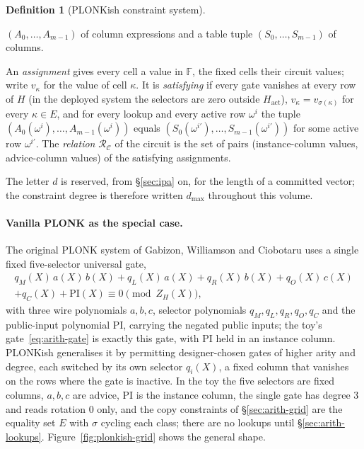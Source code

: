 \documentclass[11pt,a4paper]{article}
\theoremstyle{definition}
\newtheorem{definition}[theorem]{Definition}
\newcommand{\F}{\mathbb{F}}
\newcommand{\Rel}{\mathcal{R}}
\newcommand{\ZH}{Z_H}
\begin{document}
\begin{definition}[PLONKish constraint system]
\begin{enumerate}[leftmargin=*, itemsep=1pt]
  $(A_0, \dots, A_{m-1})$ of column expressions and a table tuple
  $(S_0, \dots, S_{m-1})$ of columns.
\end{enumerate}
An \emph{assignment} gives every cell a value in $\F$, the fixed cells
their circuit values; write $v_\kappa$ for the value of cell $\kappa$. It
is \emph{satisfying} if every gate vanishes at every row of $H$ (in the
deployed system the selectors are zero outside $H_{\mathrm{act}}$),
$v_\kappa = v_{\sigma(\kappa)}$ for every $\kappa \in E$, and for every
lookup and every active row $\omega^i$ the tuple
$(A_0(\omega^i), \dots, A_{m-1}(\omega^i))$ equals
$(S_0(\omega^{i'}), \dots, S_{m-1}(\omega^{i'}))$ for some active row
$\omega^{i'}$. The \emph{relation} $\Rel_{\mathcal C}$ of the circuit is
the set of pairs (instance-column values, advice-column values) of the
satisfying assignments.
\end{definition}

The letter $d$ is reserved, from \S\ref{sec:ipa} on, for the length of a
committed vector; the constraint degree is therefore written $d_{\max}$
throughout this volume.

\paragraph{Vanilla PLONK as the special case.}
The original PLONK system of Gabizon, Williamson and Ciobotaru uses a
single fixed five-selector universal gate,
\begin{multline*}
q_M(X)\,a(X)\,b(X) + q_L(X)\,a(X) + q_R(X)\,b(X) + q_O(X)\,c(X)\\
+ q_C(X) + \mathrm{PI}(X) \equiv 0 \pmod{\ZH(X)},
\end{multline*}
with three wire polynomials $a, b, c$, selector polynomials
$q_M,\allowbreak q_L,\allowbreak q_R,\allowbreak q_O,\allowbreak q_C$ and the
public-input polynomial $\mathrm{PI}$,
carrying the negated public inputs; the toy's gate~\eqref{eq:arith-gate}
is exactly this gate, with $\mathrm{PI}$ held in an instance column.
PLONKish generalises it by permitting designer-chosen gates of higher
arity and degree, each switched by its own selector $q_i(X)$, a fixed
column that vanishes on the rows where the gate is inactive. In the toy
the five selectors are fixed columns, $a, b, c$ are advice, $\mathrm{PI}$
is the instance column, the single gate has degree $3$ and reads rotation
$0$ only, and the copy
constraints of \S\ref{sec:arith-grid} are the equality set $E$ with
$\sigma$ cycling each class; there are no lookups until
\S\ref{sec:arith-lookups}. Figure~\ref{fig:plonkish-grid} shows the
general shape.
\end{document}
